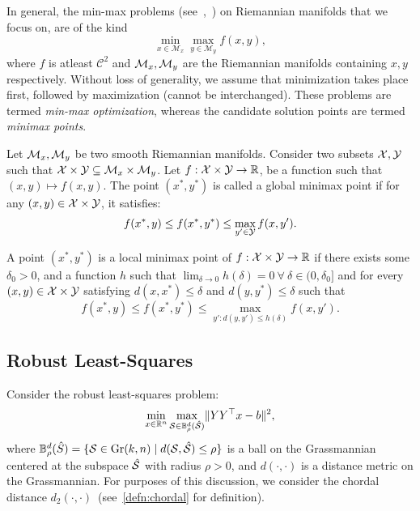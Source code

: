 \begin{definition}
In general, the min-max problems (see~\cite{han2023},~\cite{han2024}) on Riemannian manifolds that we focus on, are of the kind
\[
\min_{x \in \mathcal{M}_x} \max_{y \in \mathcal{M}_y} f(x,y),
\]
where $f$ is atleast $\mathcal{C}^2$ and $\mathcal{M}_x,\mathcal{M}_y$ are the Riemannian manifolds containing $x,y$ respectively. Without loss of generality, we assume that minimization takes place first, followed by maximization (cannot be interchanged). These problems are termed \textit{min-max optimization}, whereas the candidate solution points are termed \textit{minimax points}. 

\end{definition}
\begin{definition}\label{def:global-minimax}
    Let $\mathcal{M}_x, \mathcal{M}_y$ be two smooth Riemannian manifolds. Consider two subsets $\mathcal{X}, \mathcal{Y}$ such that $\mathcal{X} \times \mathcal{Y} \subseteq \mathcal{M}_x \times \mathcal{M}_y$. Let $f: \mathcal{X} \times \mathcal{Y} \to \mathbb{R}$, be a function such that $(x,y) \mapsto f(x,y)$. The point $(x^*, y^*)$ is called a global minimax point if for any $(x,y) \in \mathcal{X} \times \mathcal{Y}$, it satisfies:
    \[
    f(x^*,y) \leq f(x^*, y^*) \leq \max_{y' \in \mathcal{Y}} f(x, y').
    \]
\end{definition}
\begin{definition}\label{def:local-minimax}
A point $(x^*, y^*)$ is a local minimax point of $f: \mathcal{X} \times \mathcal{Y} \to \mathbb{R}$ if there exists some $\delta_0 > 0$, and a function $h$ such that $\lim_{\delta \to 0} h(\delta) = 0 \ \forall \ \delta \in (0, \delta_0]$ and for every $(x,y) \in \mathcal{X} \times \mathcal{Y}$ satisfying $d(x,x^*) \leq \delta$ and $d(y,y^*) \leq \delta$ such that
\[
f(x^*, y) \leq f(x^*, y^*) \leq \max_{y': d(y,y') \leq h(\delta)} f(x,y').
\]
\end{definition}

\subsection{Robust Least-Squares}
Consider the robust least-squares problem:
\begin{equation}\label{eq:robust-ls}
    \min_{x \in \mathbb{R}^n} \max_{\mathcal{S} \in \mathbb{B}^d_{\rho}(\hat{\mathcal{S}})} \lVert YY^\top x - b \rVert^2,
\end{equation}
where $\mathbb{B}^d_{\rho}(\hat{S}) = \{\mathcal{S} \in \text{Gr}(k,n) \mid d(\mathcal{S}, \hat{\mathcal{S}}) \leq \rho \}$ is a ball on the Grassmannian centered at the subspace $\hat{\mathcal{S}}$ with radius $\rho > 0$, and $d(\cdot, \cdot)$ is a distance metric on the Grassmannian. For purposes of this discussion, we consider the chordal distance $d_2(\cdot, \cdot)$~(see~\ref{defn:chordal} for definition).

